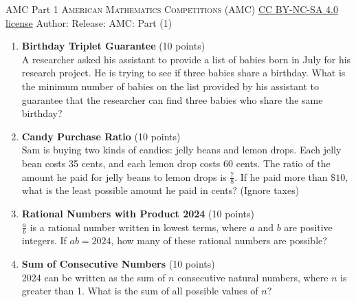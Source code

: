 \newpage\handout
{AMC Part 1}
{\textsc{American Mathematics Competitions (AMC)}}
{\href{https://creativecommons.org/licenses/by-nc-sa/4.0/}{CC BY-NC-SA 4.0 license}}
{Author: \BookAuthor}{Release: \generatedOn}
{AMC: Part (1)}


\begin{enumerate}
  \item \textbf{Birthday Triplet Guarantee} (10 points)\\
  A researcher asked his assistant to provide a list of babies born in July for his research project. He is trying to see if three babies share a birthday. What is the minimum number of babies on the list provided by his assistant to guarantee that the researcher can find three babies who share the same birthday?
  \begin{subanswer}
  \end{subanswer}

  \item \textbf{Candy Purchase Ratio} (10 points)\\
  Sam is buying two kinds of candies: jelly beans and lemon drops. Each jelly bean costs 35 cents, and each lemon drop costs 60 cents. The ratio of the amount he paid for jelly beans to lemon drops is $\frac{7}{8}$. If he paid more than $\$10$, what is the least possible amount he paid in cents? (Ignore taxes)
  \begin{subanswer}
  \end{subanswer}

  \item \textbf{Rational Numbers with Product 2024} (10 points)\\
  $\frac{a}{b}$ is a rational number written in lowest terms, where $a$ and $b$ are positive integers. If $ab=2024$, how many of these rational numbers are possible?
  \begin{subanswer}
  \end{subanswer}





  \newpage

  \item \textbf{Sum of Consecutive Numbers} (10 points)\\
  2024 can be written as the sum of $n$ consecutive natural numbers, where $n$ is greater than 1. What is the sum of all possible values of $n$?
  \begin{subanswer}
  \end{subanswer}


\end{enumerate}
